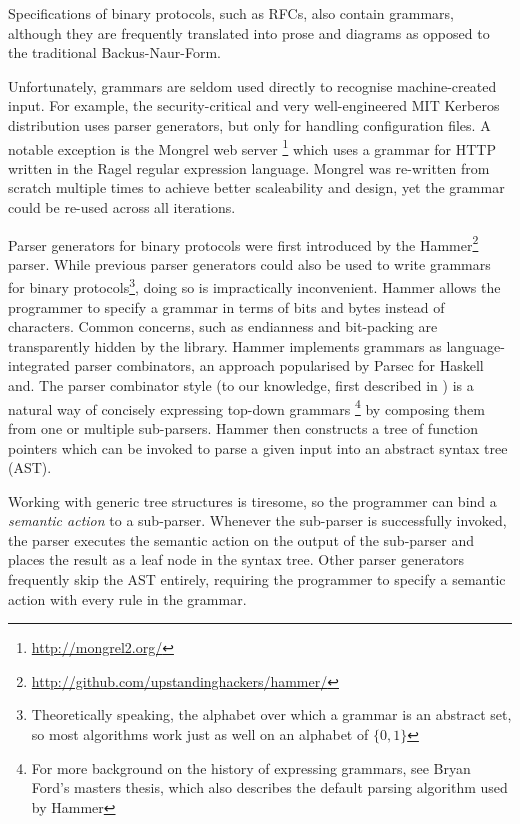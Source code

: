 Specifications of binary protocols, such as RFCs, also contain grammars, although they are
frequently translated into prose and diagrams as opposed to the traditional Backus-Naur-Form.  


Unfortunately, grammars are seldom used directly to recognise machine-created input. For example,
the security-critical and very well-engineered MIT Kerberos distribution uses parser
generators, but only for handling configuration files. A notable exception is the Mongrel
web server \footnote{\url{http://mongrel2.org/}} which uses a grammar for HTTP written in the
Ragel \cite{ragel-paper} regular expression language. Mongrel was re-written from scratch multiple
times to achieve better scaleability and design, yet the grammar could be  re-used across all iterations\cite{patterson-citation}.

 Parser generators for binary protocols were first introduced by the Hammer\footnote{\url{http://github.com/upstandinghackers/hammer/}} parser.
 While previous parser generators could also be used to write grammars for binary
 protocols\footnote{Theoretically speaking, the alphabet over which a grammar is an  abstract set,
   so most algorithms work just as well on an alphabet of $\{0,1\}$}, doing so is impractically
 inconvenient. Hammer allows the programmer to specify a grammar in terms of bits and bytes instead
 of characters. Common concerns, such as endianness and bit-packing are transparently hidden by the
 library. Hammer implements grammars as language-integrated parser combinators, an approach
 popularised by Parsec for Haskell\cite{LeijenMeijer:parsec} and. The parser combinator style (to our
 knowledge, first  described in \cite{burge1975recursive}) is a natural way of concisely expressing
 top-down grammars\cite{Danielsson:2010:TPC:1863543.1863585} \footnote{For more background on the history of expressing grammars, see Bryan
   Ford's masters thesis\cite{ford2002packrat}, which also describes the default parsing algorithm used by Hammer} by composing them from one or multiple sub-parsers. 
  Hammer then constructs a tree of function pointers which
 can be invoked to parse a given input into an abstract syntax tree (AST).
 
Working with generic tree structures is tiresome, so the programmer can bind a \textit{semantic action} to a
sub-parser. Whenever the sub-parser is successfully invoked, the parser executes the semantic action
on the output of the sub-parser and places the result as a leaf node in the syntax tree. Other
parser generators frequently skip the AST entirely, requiring the programmer to specify a semantic
action with every rule in the grammar. 

